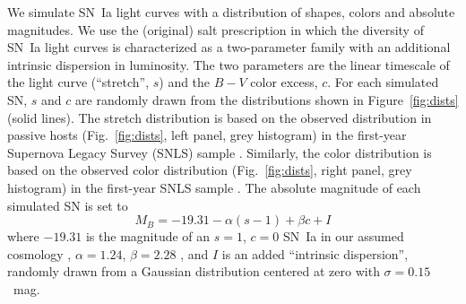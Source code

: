 

We simulate SN~Ia light curves with a distribution of shapes, colors
and absolute magnitudes.  We use the (original) {\sc
salt} \citep{guy05a} prescription in which the diversity of SN~Ia
light curves is characterized as a two-parameter family with an
additional intrinsic dispersion in luminosity.  The two parameters are
the linear timescale of the light curve (``stretch'', $s$) and the
$B-V$ color excess, $c$.  For each simulated SN, $s$ and $c$ are
randomly drawn from the distributions shown in Figure~\ref{fig:dists}
(solid lines). The stretch distribution is based on the
observed distribution in passive hosts
(Fig.~\ref{fig:dists}, left panel, grey histogram) in the
first-year Supernova Legacy Survey (SNLS) sample \citep{sullivan06a}.
Similarly, the color distribution is based on the observed color
distribution (Fig.~\ref{fig:dists}, right panel, grey
histogram) in the first-year SNLS sample \citep{astier06a}.  The
absolute magnitude of each simulated SN is set to
\begin{equation}
M_B = -19.31 - \alpha (s-1) + \beta c + I
\end{equation}
where $-19.31$ is the magnitude of an $s=1$, $c=0$ SN~Ia in our
assumed cosmology \citep{astier06a}, $\alpha = 1.24$, $\beta =
2.28$ \citep{kowalski08a}, and $I$ is an added ``intrinsic
dispersion'', randomly drawn from a Gaussian distribution centered at
zero with $\sigma = 0.15$~mag.

